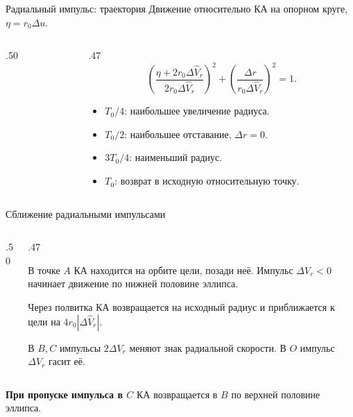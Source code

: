 \documentclass[11pt,aspectratio=169,t]{beamer}
\newcommand{\eqcompact}{\fontsize{10}{12}\selectfont}
\begin{document}
\begin{frame}{Радиальный импульс: траектория}
\relax
Движение относительно КА на опорном круге, $\eta=r_0\Delta u$.
\smallskip
\begin{columns}[T,onlytextwidth]
\begin{column}{.50\textwidth}
\centering
\end{column}
\begin{column}{.47\textwidth}
{\eqcompact
\setlength{\abovedisplayskip}{3pt}\setlength{\belowdisplayskip}{3pt}
\setlength{\abovedisplayshortskip}{2pt}\setlength{\belowdisplayshortskip}{2pt}
\[
 \left(\frac{\eta+2r_0{\Delta\widehat V_r}}{2r_0{\Delta\widehat V_r}}\right)^2
 +\left(\frac{\Delta r}{r_0{\Delta\widehat V_r}}\right)^2=1.
\]
}
\begin{itemize}
 \setlength{\itemsep}{2pt}
 \item $T_0/4$: наибольшее увеличение радиуса.
 \item $T_0/2$: наибольшее отставание, $\Delta r=0$.
 \item $3T_0/4$: наименьший радиус.
 \item $T_0$: возврат в исходную относительную точку.
\end{itemize}
\end{column}
\end{columns}
\end{frame}

\begin{frame}{Сближение радиальными импульсами}
\relax
\begin{columns}[T,onlytextwidth]
\begin{column}{.50\textwidth}
\centering
\end{column}
\begin{column}{.47\textwidth}
{\justifying
В точке $A$ КА находится на орбите цели, позади неё. Импульс $\Delta V_r<0$ начинает движение по нижней половине эллипса.\par}
\smallskip
Через полвитка КА возвращается на исходный радиус и приближается к цели на $4r_0|\Delta\widehat V_r|$.
\par\smallskip
{\justifying
В $B,C$ импульсы $2\Delta V_r$ меняют знак радиальной скорости. В $O$ импульс $\Delta V_r$ гасит её.\par}
\end{column}
\end{columns}
\smallskip
{\justifying
\textbf{При пропуске импульса в $C$} КА возвращается в $B$ по верхней половине эллипса.\par}
\end{frame}
\end{document}
